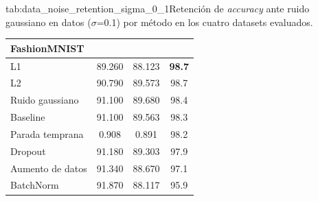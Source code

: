 \begin{table}{tab:data_noise_retention_sigma_0_1}{Retención de \textit{accuracy} ante ruido gaussiano en datos ($\sigma$=0.1) por método en los cuatro datasets evaluados.}
\begin{tabular}{lccc}
\midrule
\multicolumn{4}{l}{\textbf{FashionMNIST}}\\
\midrule
L1 & 89.260 & 88.123 & \textbf{98.7} \\
L2 & 90.790 & 89.573 & 98.7 \\
Ruido gaussiano & 91.100 & 89.680 & 98.4 \\
Baseline & 91.100 & 89.563 & 98.3 \\
Parada temprana & 0.908 & 0.891 & 98.2 \\
Dropout & 91.180 & 89.303 & 97.9 \\
Aumento de datos & 91.340 & 88.670 & 97.1 \\
BatchNorm & 91.870 & 88.117 & 95.9 \\
\bottomrule
\end{tabular}
\end{table}